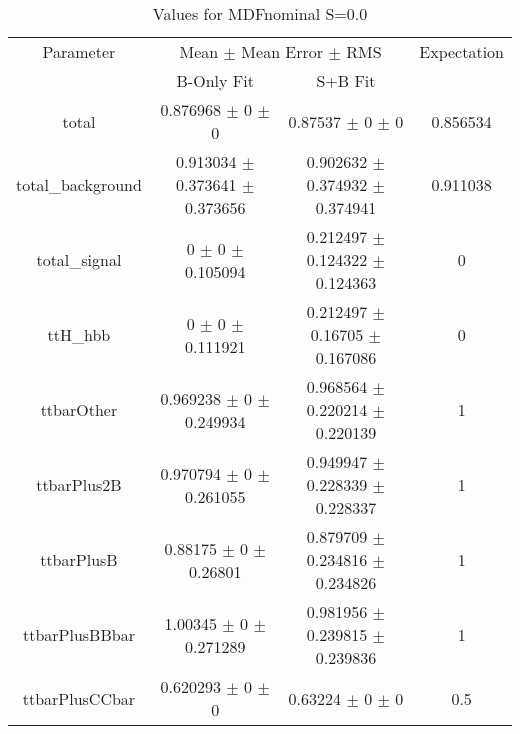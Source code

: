 \begin{table}
\centering
\caption{Values for MDFnominal S=0.0}
\begin{tabular}{cccc}
\toprule
Parameter & \multicolumn{2}{c}{Mean $\pm$ Mean Error $\pm$ RMS} & Expectation\\
 & B-Only Fit & S+B Fit & \\
\midrule
total & \num{0.876968} $\pm$ \num{0} $\pm$ \num{0} & \num{0.87537} $\pm$ \num{0} $\pm$ \num{0} & \num{0.856534}\\
total\_background & \num{0.913034} $\pm$ \num{0.373641} $\pm$ \num{0.373656} & \num{0.902632} $\pm$ \num{0.374932} $\pm$ \num{0.374941} & \num{0.911038}\\
total\_signal & \num{0} $\pm$ \num{0} $\pm$ \num{0.105094} & \num{0.212497} $\pm$ \num{0.124322} $\pm$ \num{0.124363} & \num{0}\\
ttH\_hbb & \num{0} $\pm$ \num{0} $\pm$ \num{0.111921} & \num{0.212497} $\pm$ \num{0.16705} $\pm$ \num{0.167086} & \num{0}\\
ttbarOther & \num{0.969238} $\pm$ \num{0} $\pm$ \num{0.249934} & \num{0.968564} $\pm$ \num{0.220214} $\pm$ \num{0.220139} & \num{1}\\
ttbarPlus2B & \num{0.970794} $\pm$ \num{0} $\pm$ \num{0.261055} & \num{0.949947} $\pm$ \num{0.228339} $\pm$ \num{0.228337} & \num{1}\\
ttbarPlusB & \num{0.88175} $\pm$ \num{0} $\pm$ \num{0.26801} & \num{0.879709} $\pm$ \num{0.234816} $\pm$ \num{0.234826} & \num{1}\\
ttbarPlusBBbar & \num{1.00345} $\pm$ \num{0} $\pm$ \num{0.271289} & \num{0.981956} $\pm$ \num{0.239815} $\pm$ \num{0.239836} & \num{1}\\
ttbarPlusCCbar & \num{0.620293} $\pm$ \num{0} $\pm$ \num{0} & \num{0.63224} $\pm$ \num{0} $\pm$ \num{0} & \num{0.5}\\
\bottomrule
\end{tabular}
\end{table}